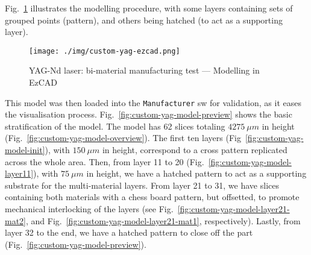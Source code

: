 Fig.~\ref{fig:custom-yag-ezcad} illustrates the modelling procedure,
with some layers containing sets of grouped points (pattern), and others being
hatched (to act as a supporting layer).

\begin{figure}[hbtp!]
  \centering
    \texttt{[image: ./img/custom-yag-ezcad.png]}
  \caption{YAG-Nd laser: bi-material manufacturing test --- Modelling in EzCAD}%
  \label{fig:custom-yag-ezcad}
\end{figure}

This model was then loaded into the \texttt{Manufacturer} \gls{sw} for
validation, as it eases the visualisation
process. Fig.~\ref{fig:custom-yag-model-preview} shows the basic stratification
of the model. The model has 62 slices totaling $4275~\mu m$ in height
(Fig.~\ref{fig:custom-yag-model-overview}).
The first ten layers (Fig~\ref{fig:custom-yag-model-init}), with $150~\mu m$ in height, correspond to a
cross pattern replicated across the whole area. Then, from layer 11 to 20 (Fig.~\ref{fig:custom-yag-model-layer11}), with
$75~\mu m$ in height, we have a hatched pattern to act as a supporting substrate
for the multi-material layers. From layer 21 to 31, we have slices containing
both materials with a chess board pattern, but offsetted, to promote mechanical
interlocking of the layers (see Fig.~\ref{fig:custom-yag-model-layer21-mat2},
and Fig.~\ref{fig:custom-yag-model-layer21-mat1}, respectively).
Lastly, from layer 32 to the end, we have a hatched pattern to close off the
part (Fig.~\ref{fig:custom-yag-model-preview}).


